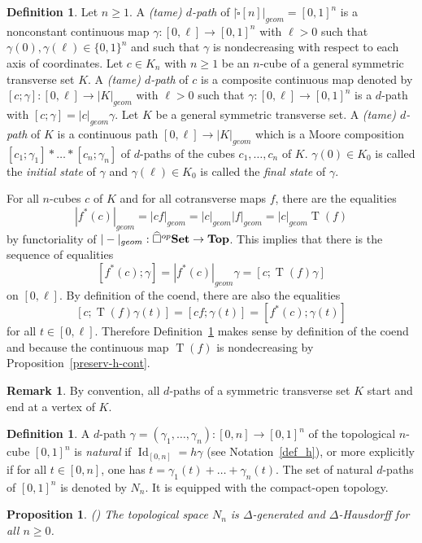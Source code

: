 \documentclass[a4paper,12pt]{amsart}
\newtheorem{prop}[thm]{Proposition}
\newcommand{\bp}{\begin{prop}}
\newcommand{\ep}{\end{prop}}
\theoremstyle{definition}
\newtheorem{defn}[thm]{Definition}
\newtheorem{rem}[thm]{Remark}
\newcommand{\bd}{\begin{defn}}
\newcommand{\ed}{\end{defn}}
\renewcommand{\top}{{\mathbf{Top}}}
\renewcommand{\geq}{\geqslant}
\newcommand{\brm}[1]{{\rm{\mathbf{#1}}}}
\newcommand{\set}{{\brm{Set}}}
\DeclareMathOperator{\id}{Id}
\DeclareMathOperator{\TT}{T}
\begin{document}
\bd \label{dpath} Let $n\geq 1$. A \textit{(tame) $d$-path} of $|\widehat{\square}[n]|_{geom} = [0,1]^n$ is a nonconstant continuous map $\gamma:[0,\ell]\to [0,1]^n$ with $\ell>0$ such that $\gamma(0),\gamma(\ell)\in \{0,1\}^n$ and such that $\gamma$ is nondecreasing with respect to each axis of coordinates. Let $c\in K_n$ with $n\geq 1$ be an $n$-cube of a general symmetric transverse set $K$. A \textit{(tame) $d$-path} of $c$ is a composite continuous map denoted by $[c;\gamma]:[0,\ell] \to |K|_{geom}$ with $\ell>0$ such that $\gamma:[0,\ell]\to [0,1]^n$ is a $d$-path with $[c;\gamma]=|c|_{geom}\gamma$. Let $K$ be a general symmetric transverse set. A \textit{(tame) $d$-path} of $K$ is a continuous path $[0,\ell] \to |K|_{geom}$ which is a Moore composition $[c_1;\gamma_1] * \dots *[c_n;\gamma_n]$ of $d$-paths of the cubes $c_1,\dots,c_n$ of $K$. $\gamma(0)\in K_0$ is called the \textit{initial state} of $\gamma$ and $\gamma(\ell)\in K_0$ is called the \textit{final state} of $\gamma$. 
\ed

For all $n$-cubes $c$ of $K$ and for all cotransverse maps $f$, there are the equalities \[|f^*(c)|_{geom}=|cf|_{geom} = |c|_{geom}|f|_{geom} = |c|_{geom}\TT(f)\] by functoriality of $|-|_{geom}:\widehat{\square}^{op}\set\to \top$. This implies that there is the sequence of equalities \[[f^*(c);\gamma] = |f^*(c)|_{geom}\gamma = [c;\TT(f)\gamma]\] on $[0,\ell]$. By definition of the coend, there are also the equalities \[[c;\TT(f)\gamma(t)]=[cf;\gamma(t)] = [f^*(c);\gamma(t)]\] for all $t\in [0,\ell]$. Therefore Definition~\ref{dpath} makes sense by definition of the coend and because the continuous map $\TT(f)$ is nondecreasing by Proposition~\ref{preserv-h-cont}. 

\begin{rem}
	By convention, all $d$-paths of a symmetric transverse set $K$ start and end at a vertex of $K$.
\end{rem}


\bd \label{natural_dpath_cube} A $d$-path $\gamma=(\gamma_1,\dots,\gamma_n):[0,n]\to [0,1]^n$ of the topological $n$-cube $[0,1]^n$ is \textit{natural} if $\id_{[0,n]} = h\gamma$ (see Notation~\ref{def_h}), or more explicitly if for all $t\in [0,n]$, one has $t=\gamma_1(t)+\dots +\gamma_n(t)$. The set of natural $d$-paths of $[0,1]^n$ is denoted by $N_n$. It is equipped with the compact-open topology. 
\ed

\bp (\cite[Proposition~4.10]{NaturalRealization})
The topological space $N_n$ is $\Delta$-generated and $\Delta$-Hausdorff for all $n\geq 0$.
\ep
\end{document}
